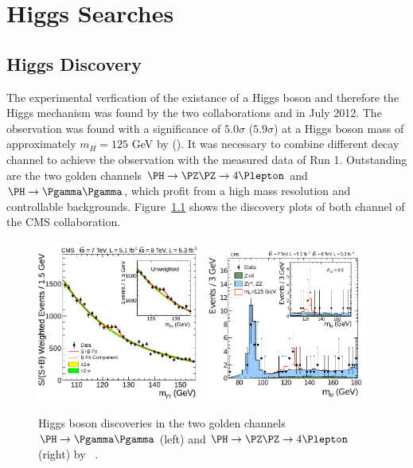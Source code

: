 \chapter{Higgs Searches \label{chapter3_analysis}}

\section{Higgs Discovery}
The experimental verfication of the existance of a Higgs boson and therefore the Higgs mechanism was found by
the two collaborations \CMS and \ATLAS in July 2012. The observation was found with a significance of $5.0\sigma$ ($5.9\sigma$)
at a Higgs boson mass of approximately $m_H=125$ GeV by \CMS (\ATLAS). It was necessary to combine different decay channel to
achieve the observation with the measured \LHC data of Run 1. Outstanding are the two golden channels $\PH \rightarrow \PZ \PZ \rightarrow 4\Plepton$ and
$\PH \rightarrow \Pgamma \Pgamma$, which profit from a high mass resolution and controllable backgrounds. Figure~\ref{figure_higgs_discovery_cms} shows the
discovery plots of both channel of the CMS collaboration.

\begin{figure}[h]
\includegraphics[width=0.48\textwidth]{../plots/HiggsGG_discovery.pdf}
\hfill
\includegraphics[width=0.48\textwidth]{../plots/HiggsZZ_discovery.pdf}
\caption[Higgs boson discovery CMS.]{Higgs boson discoveries in the two golden channels $\PH \rightarrow \Pgamma \Pgamma$ (left) and $\PH \rightarrow \PZ \PZ \rightarrow 4\Plepton$ (right) by \CMS~\cite{HiggsDiscovery_CMS}.}
\label{figure_higgs_discovery_cms}
\end{figure}

